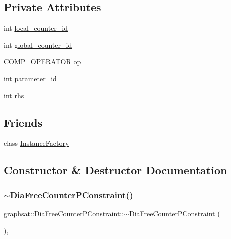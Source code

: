 \subsection*{Private Attributes}
\begin{DoxyCompactItemize}
\item 
int \mbox{\hyperlink{classgraphsat_1_1_dia_free_counter_p_constraint_afc2918027f82698325ddb73db9804aff}{local\+\_\+counter\+\_\+id}}
\item 
int \mbox{\hyperlink{classgraphsat_1_1_dia_free_counter_p_constraint_af41ef7de4742ef231461d7f68ad7d766}{global\+\_\+counter\+\_\+id}}
\item 
\mbox{\hyperlink{namespacegraphsat_acfb5939f9bdafbd9aea0d084b9a56f69}{C\+O\+M\+P\+\_\+\+O\+P\+E\+R\+A\+T\+OR}} \mbox{\hyperlink{classgraphsat_1_1_dia_free_counter_p_constraint_afe124075562b0ade432cf32a7da61450}{op}}
\item 
int \mbox{\hyperlink{classgraphsat_1_1_dia_free_counter_p_constraint_ae31bb8536d59923a04c22c200b4ce498}{parameter\+\_\+id}}
\item 
int \mbox{\hyperlink{classgraphsat_1_1_dia_free_counter_p_constraint_afa08c9c70ca85a54119c01e3b791e052}{rhs}}
\end{DoxyCompactItemize}
\subsection*{Friends}
\begin{DoxyCompactItemize}
\item 
class \mbox{\hyperlink{classgraphsat_1_1_dia_free_counter_p_constraint_ad4b3c25c041701ae56dc1e78df779d2f}{Instance\+Factory}}
\end{DoxyCompactItemize}


\subsection{Constructor \& Destructor Documentation}
\mbox{\label{classgraphsat_1_1_dia_free_counter_p_constraint_aab8266583181e8f12f8d1b4bbede96cb}} 
\subsubsection{\texorpdfstring{$\sim$DiaFreeCounterPConstraint()}{~DiaFreeCounterPConstraint()}}
{\footnotesize\ttfamily graphsat\+::\+Dia\+Free\+Counter\+P\+Constraint\+::$\sim$\+Dia\+Free\+Counter\+P\+Constraint (\begin{DoxyParamCaption}{ }\end{DoxyParamCaption})\hspace{0.3cm}{\ttfamily [inline]}, {\ttfamily [protected]}}

